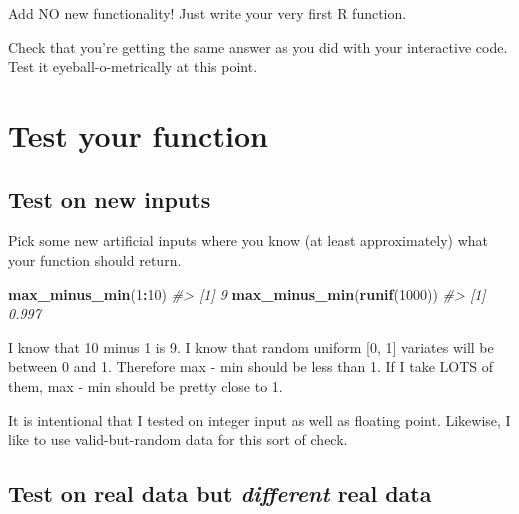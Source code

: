 \documentclass[
]{book}
\newenvironment{Shaded}{\begin{snugshade}}{\end{snugshade}}
\newcommand{\CommentTok}[1]{\textcolor[rgb]{0.56,0.35,0.01}{\textit{#1}}}
\newcommand{\ControlFlowTok}[1]{\textcolor[rgb]{0.13,0.29,0.53}{\textbf{#1}}}
\newcommand{\DecValTok}[1]{\textcolor[rgb]{0.00,0.00,0.81}{#1}}
\newcommand{\KeywordTok}[1]{\textcolor[rgb]{0.13,0.29,0.53}{\textbf{#1}}}
\newcommand{\NormalTok}[1]{#1}
\newcommand{\OperatorTok}[1]{\textcolor[rgb]{0.81,0.36,0.00}{\textbf{#1}}}
\newcommand{\StringTok}[1]{\textcolor[rgb]{0.31,0.60,0.02}{#1}}
\begin{document}
Add NO new functionality! Just write your very first R function.

\begin{Shaded}
\end{Shaded}

Check that you're getting the same answer as you did with your interactive code. Test it eyeball-o-metrically at this point.

\hypertarget{test-your-function}{%
\section{Test your function}\label{test-your-function}}

\hypertarget{test-on-new-inputs}{%
\subsection{Test on new inputs}\label{test-on-new-inputs}}

Pick some new artificial inputs where you know (at least approximately) what your function should return.

\begin{Shaded}
\begin{Highlighting}[]
\KeywordTok{max_minus_min}\NormalTok{(}\DecValTok{1}\OperatorTok{:}\DecValTok{10}\NormalTok{)}
\CommentTok{#> [1] 9}
\KeywordTok{max_minus_min}\NormalTok{(}\KeywordTok{runif}\NormalTok{(}\DecValTok{1000}\NormalTok{))}
\CommentTok{#> [1] 0.997}
\end{Highlighting}
\end{Shaded}

I know that 10 minus 1 is 9. I know that random uniform {[}0, 1{]} variates will be between 0 and 1. Therefore max - min should be less than 1. If I take LOTS of them, max - min should be pretty close to 1.

It is intentional that I tested on integer input as well as floating point. Likewise, I like to use valid-but-random data for this sort of check.

\hypertarget{test-on-real-data-but-different-real-data}{%
\subsection{\texorpdfstring{Test on real data but \emph{different} real data}{Test on real data but different real data}}\label{test-on-real-data-but-different-real-data}}
\end{document}
